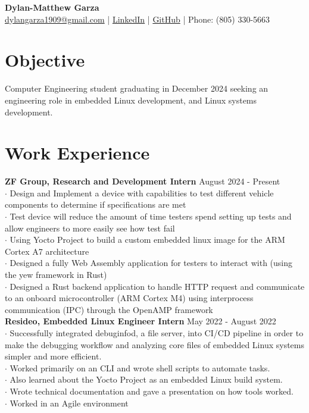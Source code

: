 \documentclass[a4paper,12pt]{article}
\begin{document}
\begin{center}
\textbf{\LARGE Dylan-Matthew Garza} \\[0.1cm]
\href{mailto:dylangarza1909@gmail.com}{dylangarza1909@gmail.com} |
\href{https://www.linkedin.com/in/dylan-matthew-garza-094b021ba/}{LinkedIn} |
\href{https://github.com/DMGDy}{GitHub} |
Phone: (805) 330-5663
\end{center}

\section*{Objective}
Computer Engineering student graduating in December 2024 seeking an 
engineering role in embedded Linux development, and Linux systems 
development.

\vspace{-.5cm} \section*{Work Experience} \textbf{ZF Group, Research and Development Intern} \hfill August 2024 - Present\\ 
$\cdot$ Design and Implement a device with capabilities to test different vehicle components to determine if specifications are met\\
$\cdot$ Test device will reduce the amount of time testers spend setting up tests and allow engineers to more easily
  see how test fail\\
$\cdot$ Using Yocto Project to build a custom embedded linux image for the ARM Cortex A7 architecture \\
$\cdot$ Designed a fully Web Assembly application for testers to interact with (using the yew framework in Rust) \\
$\cdot$ Designed a Rust backend application to handle HTTP request and communicate to an onboard microcontroller (ARM Cortex M4)
using interprocess communication (IPC) through the OpenAMP framework\\


\vspace{-.25cm}\noindent\textbf{Resideo, Embedded Linux
Engineer Intern} \hfill May 2022 - August 2022\\ 
$\cdot$ Successfully integrated
debuginfod, a file server, into CI/CD pipeline in order to make the debugging
workflow and analyzing core files of embedded Linux systems simpler and more
efficient.\\
$\cdot$ Worked primarily on an CLI and wrote shell scripts to automate
tasks.\\
$\cdot$ Also learned about the Yocto Project as an embedded Linux build
system.\\
$\cdot$ Wrote technical documentation and gave a presentation on 
how tools worked.\\
$\cdot$ Worked in an Agile environment \\
\end{document}
